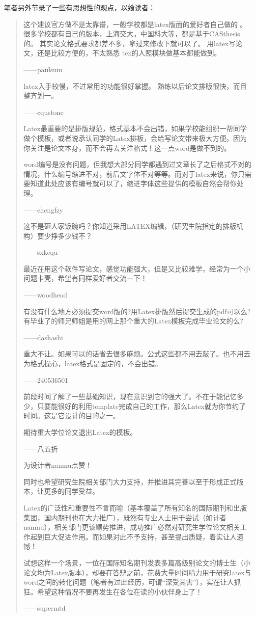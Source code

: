 笔者另外节录了一些有思想性的观点，以飨读者：
\begin{quotation}
	这个建议官方做不是太靠谱，一般学校都是latex版面的爱好者自己做的 。
	很多学校都有自己的版本，上海交大，中国科大等，都是基于CASthesis 的。
	其实论文格式要求都差不多，拿过来修改下就可以了。
	用latex写论文，还是比较方便的，不太熟悉 tex的人照模块做基本都能做到。
	\par\hfill ——paulsum
	
	latex入手较慢，不过常用的功能很好掌握。
	熟练以后论文排版很快，而且整齐划一。
	\par\hfill ——cqustone
	
	Latex最重要的是排版规范，格式基本不会出错，如果学校能组织一帮同学做个模板，或者说承认同学的Latex排板，会给写论文带来极大方便。因为你关注是论文本身，而不会再去关注格式！这一点word是做不到的。
	
	word编号是没有问题，但我想大部分同学都遇到过文章长了之后格式不对的情况，什么编号缩进不对，前后文字体不对等等。而对于latex来说，你只需要知道此处应该有编号就可以了，缩进字体这些提供的模板自然会帮你处理。
	\par\hfill ——chengfzy
	
	这不是砸人家饭碗吗？你知道采用LATEX编辑，（研究生院指定的排版机构）要少挣多少钱不？
	\par\hfill ——sxkcqu
	
	最近在用这个软件写论文，感觉功能强大，但是又比较难学，经常为一个小问题卡壳，希望有同样爱好者交流一下！
	\par\hfill ——woodhead
	
	有没有什么地方必须提交word版的?用Latex排版然后提交生成的pdf可以么?有毕业了的师兄师姐是用的网上那个重大的Latex模板完成毕业论文的么?
	\par\hfill ——dashashi
	
	重大不让。如果可以的话省去很多麻烦。公式这些都不用去敲了。也不用去为格式操心，latex格式是固定的，不会出错。
	\par\hfill ——240536501
	
	前段时间了解了一些基础知识，现在意识到它的强大了。不在于能记忆多少，只要能很好的利用template完成自己的工作，那么Latex就为你节约了时间。这是它设计的目的之一。
	
	期待重大学位论文退出Latex的模板。
	\par\hfill ——八五折
	
	为设计者nanmu点赞！
	
	同时也希望研究生院相关部门大力支持，并推进其完善以至于形成正式版本，让更多的同学受益。
	
	Latex的广泛性和重要性不言而喻（基本覆盖了所有知名的国际期刊和出版集团，国内期刊也在大力推广），既然有专业人士用于尝试（如计者nanmu），相关部门更该顺势推进，成功推广必然对研究生学位论文相关工作起到巨大促进作用。而如果对此不予支持，甚至提出质疑，着实让人遗憾！
	
	试想这样一个场景，一位在国际知名期刊发表多篇高级别论文的博士生（小论文均为Latex版本），却要在答辩之前，花费大量时间精力用于研究latex与word之间的转化问题（笔者有过此经历，可谓“深受其害”），实在让人抓狂。希望这种情况不要再发生在各位在读的小伙伴身上了！
	\par\hfill ——supermtd
\end{quotation}

